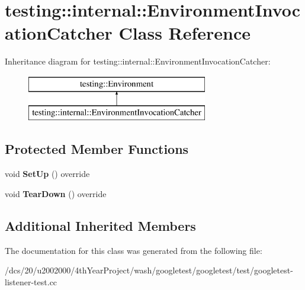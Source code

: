 \hypertarget{classtesting_1_1internal_1_1EnvironmentInvocationCatcher}{}\section{testing\+:\+:internal\+:\+:Environment\+Invocation\+Catcher Class Reference}
\label{classtesting_1_1internal_1_1EnvironmentInvocationCatcher}
Inheritance diagram for testing\+:\+:internal\+:\+:Environment\+Invocation\+Catcher\+:\begin{figure}[H]
\begin{center}
\leavevmode
\includegraphics[height=2.000000cm]{classtesting_1_1internal_1_1EnvironmentInvocationCatcher}
\end{center}
\end{figure}
\subsection*{Protected Member Functions}
\begin{DoxyCompactItemize}
\item 
\mbox{\label{classtesting_1_1internal_1_1EnvironmentInvocationCatcher_a95400d20847acd38742ba372f87240dc}} 
void {\bfseries Set\+Up} () override
\item 
\mbox{\label{classtesting_1_1internal_1_1EnvironmentInvocationCatcher_a50097d7cb8997fef0e2df90a564949f0}} 
void {\bfseries Tear\+Down} () override
\end{DoxyCompactItemize}
\subsection*{Additional Inherited Members}


The documentation for this class was generated from the following file\+:\begin{DoxyCompactItemize}
\item 
/dcs/20/u2002000/4th\+Year\+Project/wash/googletest/googletest/test/googletest-\/listener-\/test.\+cc\end{DoxyCompactItemize}
